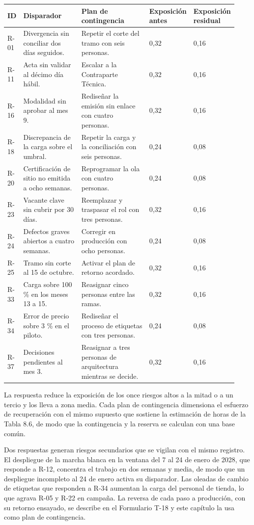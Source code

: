 \documentclass[11pt]{article}
\begin{document}
\begin{longtable}{p{0.066\linewidth}p{0.275\linewidth}p{0.323\linewidth}p{0.133\linewidth}p{0.133\linewidth}}
\toprule
\textbf{ID} & \textbf{Disparador} & \textbf{Plan de contingencia} & \textbf{Exposición antes} & \textbf{Exposición residual} \\
\midrule
\endhead
\bottomrule
\endlastfoot
R-01 & Divergencia sin conciliar dos días seguidos. & Repetir el corte del tramo con seis personas. & 0,32 & 0,16 \\
R-11 & Acta sin validar al décimo día hábil. & Escalar a la Contraparte Técnica. & 0,32 & 0,16 \\
R-16 & Modalidad sin aprobar al mes 9. & Rediseñar la emisión sin enlace con cuatro personas. & 0,32 & 0,16 \\
R-18 & Discrepancia de la carga sobre el umbral. & Repetir la carga y la conciliación con seis personas. & 0,24 & 0,08 \\
R-20 & Certificación de sitio no emitida a ocho semanas. & Reprogramar la ola con cuatro personas. & 0,24 & 0,08 \\
R-23 & Vacante clave sin cubrir por 30 días. & Reemplazar y traspasar el rol con tres personas. & 0,32 & 0,16 \\
R-24 & Defectos graves abiertos a cuatro semanas. & Corregir en producción con ocho personas. & 0,24 & 0,08 \\
R-25 & Tramo sin corte al 15 de octubre. & Activar el plan de retorno acordado. & 0,32 & 0,16 \\
R-33 & Carga sobre 100 \% en los meses 13 a 15. & Reasignar cinco personas entre las ramas. & 0,32 & 0,16 \\
R-34 & Error de precio sobre 3 \% en el piloto. & Rediseñar el proceso de etiquetas con tres personas. & 0,24 & 0,08 \\
R-37 & Decisiones pendientes al mes 3. & Reasignar a tres personas de arquitectura mientras se decide. & 0,32 & 0,16 \\
\end{longtable}

La respuesta reduce la exposición de los once riesgos altos a la mitad o a un tercio y los lleva a zona media. Cada plan de contingencia dimensiona el esfuerzo de recuperación con el mismo supuesto que sostiene la estimación de horas de la Tabla 8.6, de modo que la contingencia y la reserva se calculan con una base común.

Dos respuestas generan riesgos secundarios que se vigilan con el mismo registro. El despliegue de la marcha blanca en la ventana del 7 al 24 de enero de 2028, que responde a R-12, concentra el trabajo en dos semanas y media, de modo que un despliegue incompleto al 24 de enero activa su disparador. Las oleadas de cambio de etiquetas que responden a R-34 aumentan la carga del personal de tienda, lo que agrava R-05 y R-22 en campaña. La reversa de cada paso a producción, con su retorno ensayado, se describe en el Formulario T-18 y este capítulo la usa como plan de contingencia.
\end{document}
